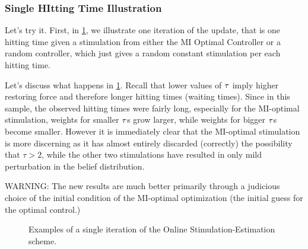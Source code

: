 \subsubsection{Single HItting Time Illustration}
Let's try it. First, in \cref{fig:example_online_miopt_single_iteration}, we
illustrate one iteration of the update, that is one hitting time given a
stimulation from either the MI Optimal Controller or a random controller, which
just gives a random constant stimulation per each hitting time.

Let's discuss what happens in \cref{fig:example_online_miopt_single_iteration}.
Recall that lower values of ${ \tau }$ imply higher restoring force and therefore
longer hitting times (waiting times). Since in this sample, the observed hitting
times were fairly long, especially for the MI-optimal stimulation, weights for
smaller ${\tau}$s grow larger, while weights for bigger ${\tau}$s become smaller.
However it is immediately clear that the MI-optimal stimulation is more
discerning as it has almost entirely discarded (correctly) the
possibility that $\tau>2$, while the other two stimulations have resulted in
only mild perturbation in the belief distribution. 

WARNING: The new results are much better primarily through a judicious choice of
the initial condition of the MI-optimal optimization (the initial guess for the
optimal control.)

\begin{figure}[h]
\begin{center}
\caption[labelInTOC]{Examples of a single iteration of the Online
Stimulation-Estimation scheme.  }
\label{fig:example_online_miopt_single_iteration}
\end{center}
\end{figure}

